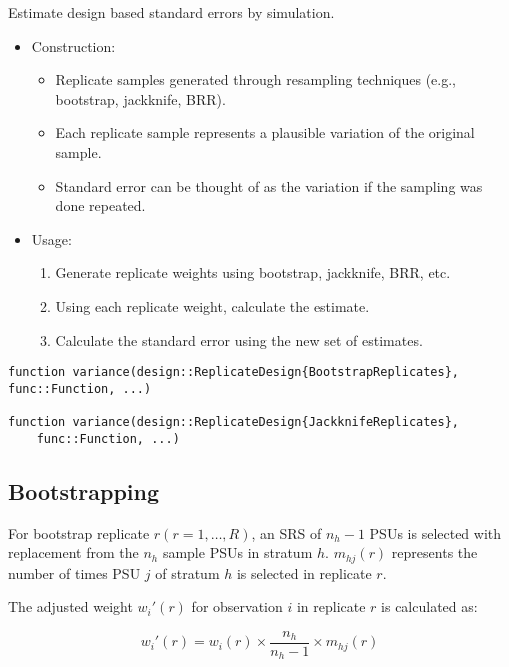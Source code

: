 \documentclass{juliacon}
\begin{document}
Estimate design based standard errors by simulation. 
    \begin{itemize}
        \item Construction:
            \begin{itemize}
                \item Replicate samples generated through resampling techniques (e.g., bootstrap, jackknife, BRR).
                \item Each replicate sample represents a plausible variation of the original sample.
                \item Standard error can be thought of as the variation if the sampling was done repeated. 
            \end{itemize}
        \item Usage:
            \begin{enumerate}
                \item Generate replicate weights using bootstrap, jackknife, BRR, etc. 
                \item Using each replicate weight, calculate the estimate. 
                \item Calculate the standard error using the new set of estimates. 
            \end{enumerate}
        \end{itemize}

\begin{lstlisting}
function variance(design::ReplicateDesign{BootstrapReplicates},
func::Function, ...)

function variance(design::ReplicateDesign{JackknifeReplicates},
    func::Function, ...)
\end{lstlisting}

\subsection{Bootstrapping}

For bootstrap replicate $r (r = 1, \dots, R)$, an SRS of $n_h - 1$ PSUs is selected with replacement from the $n_h$ sample PSUs in stratum $h$. $m_{hj}(r)$ represents the number of times PSU $j$ of stratum $h$ is selected in replicate $r$.

The adjusted weight $w_i'(r)$ for observation $i$ in replicate $r$ is calculated as:

\begin{equation}
    w_i'(r) = w_i(r) \times \frac{n_h}{n_h - 1} \times m_{hj}(r)
\end{equation}
\end{document}
